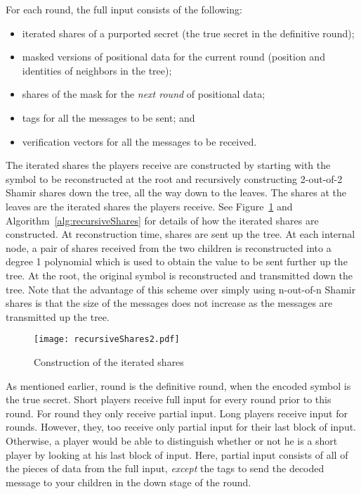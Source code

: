 \documentclass[12pt]{article}
\theoremstyle{definition}
\begin{document}
For each round, the full input consists of the following:
\begin{itemize}
\item iterated shares of a purported secret (the true secret in the 
definitive round);
\item masked versions of positional data for the current round 
(position and identities of neighbors in the tree);
\item shares of the mask for the \emph{next round} of positional data;
\item tags for all the messages to be sent; and
\item verification vectors for all the messages to be received.
\end{itemize}

The iterated shares the players receive are constructed by 
starting with the symbol to be reconstructed at the root and 
recursively constructing 2-out-of-2 Shamir shares down the tree, all 
the way down to the leaves. The shares at the leaves are the iterated 
shares the players receive. See Figure~\ref{fig:shares} and 
Algorithm~\ref{alg:recursiveShares} for details of how the iterated shares are 
constructed. At reconstruction time, shares are sent 
up the tree. At each internal node, a pair of shares received from 
the two children is reconstructed into a degree 1 polynomial which is used 
to obtain the value to be sent further up the tree. At the root, the 
original symbol is reconstructed and transmitted down the tree.  
Note that the advantage of this scheme 
over simply using n-out-of-n Shamir shares is that the size of the 
messages does not increase as the messages are transmitted up the tree.

\begin{figure}
\begin{center}
\texttt{[image: recursiveShares2.pdf]}
\end{center}
\caption{Construction of the iterated shares}
\label{fig:shares}
\end{figure}



As mentioned earlier, round  is the definitive round, when the 
encoded symbol is the true secret. Short players receive full input 
for every round prior to this round. For round  they only receive 
partial input. Long players receive input for  rounds. However,
they, too receive only partial input for their last block of input. 
Otherwise, a player would be able to distinguish whether or not he is a 
short player by looking at his last block of input.
Here, partial input consists of all of the pieces of data from the full input, 
\emph{except} the tags to send the decoded message to your children in the 
down stage of the round. 
\end{document}

